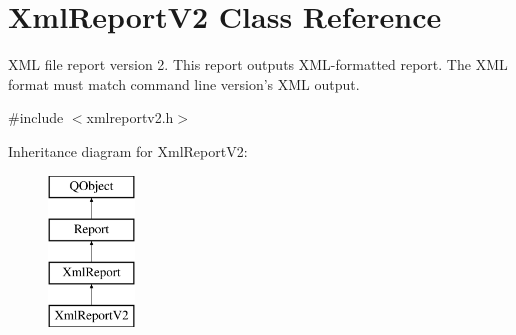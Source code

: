 \hypertarget{class_xml_report_v2}{\section{Xml\-Report\-V2 Class Reference}
\label{class_xml_report_v2}
}


X\-M\-L file report version 2. This report outputs X\-M\-L-\/formatted report. The X\-M\-L format must match command line version's X\-M\-L output.  




{\ttfamily \#include $<$xmlreportv2.\-h$>$}

Inheritance diagram for Xml\-Report\-V2\-:\begin{figure}[H]
\begin{center}
\leavevmode
\includegraphics[height=4.000000cm]{class_xml_report_v2}
\end{center}
\end{figure}
